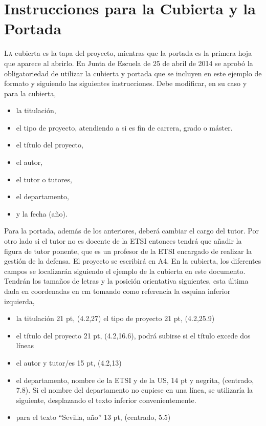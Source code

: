 \chapter{Instrucciones para la Cubierta y la Portada}\label{chp-01}

\lettrine[lraise=-0.1, lines=2, loversize=0.2]{L}{a} cubierta es la tapa del proyecto, mientras que la portada es la primera hoja que aparece al abrirlo. En Junta de Escuela de 25 de abril de 2014 se aprobó la obligatoriedad de utilizar la cubierta y portada que se incluyen en este ejemplo de formato y siguiendo las siguientes instrucciones. Debe modificar, en su caso y para la cubierta,
\begin{itemize}\itemsep1pt \parskip0pt 
\item la titulación, 
\item	el tipo de proyecto, atendiendo a si es fin de carrera, grado o máster.
\item el título del proyecto, 
\item el autor,
\item	el tutor o tutores,
\item el departamento,
\item y la fecha (año).
\end{itemize}

Para la portada, además de los anteriores, deberá cambiar el cargo del tutor. Por otro lado si el tutor no es docente de la ETSI entonces tendrá que añadir la figura de tutor ponente, que es un profesor de la ETSI encargado de realizar la gestión de la defensa.
El proyecto se escribirá en A4. En la cubierta, los diferentes campos se localizarán siguiendo el ejemplo de la cubierta en este documento. Tendrán los tamaños de letras y la posición orientativa siguientes, esta última dada en coordenadas en cm tomando como referencia la esquina inferior izquierda,
\begin{itemize}\itemsep1pt \parskip0pt 
\item la titulación 21 pt, (4.2,27)
el tipo de proyecto 21 pt, (4.2,25.9)
\item el título del proyecto 21 pt, (4.2,16.6), podrá subirse si el título excede dos líneas
\item el autor y tutor/es 15 pt, (4.2,13)
 \item el departamento, nombre de la ETSI y de la US, 14 pt y negrita, (centrado, 7.8). Si el nombre del departamento no cupiese en una línea, se utilizaría la siguiente, desplazando el texto inferior convenientemente.
\item para el texto “Sevilla, año” 13 pt, (centrado, 5.5)
\end{itemize}

